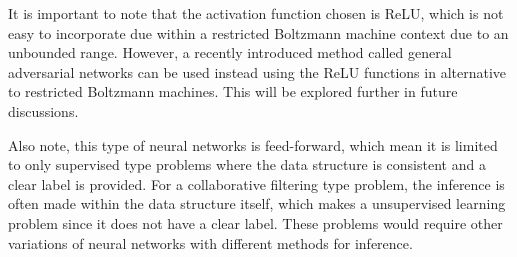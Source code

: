 \documentclass[12pt]{article}
\begin{document}
It is important to note that the activation function chosen is ReLU, 
which is not easy to incorporate due within a 
restricted Boltzmann machine context due to an unbounded range.
However, a recently introduced method called 
general adversarial networks can be used instead using the ReLU functions
in alternative to restricted Boltzmann machines.
This will be explored further in future discussions.

Also note, this type of neural networks is feed-forward, 
which mean it is limited to only supervised type problems
where the data structure is consistent and a clear label is provided.
For a collaborative filtering type problem,
the inference is often made within the data structure itself, 
which makes a unsupervised learning problem 
since it does not have a clear label.
These problems would require other variations of neural networks
with different methods for inference.
\end{document}
